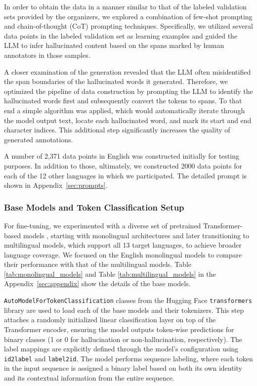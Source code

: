 \documentclass[11pt]{article}
\begin{document}
In order to obtain the data in a manner similar to that of the labeled validation sets provided by the organizers, we explored a combination of few-shot prompting and chain-of-thought (CoT) prompting techniques. Specifically, we utilized several data points in the labeled validation set as learning examples and guided the LLM to infer hallucinated content based on the spans marked by human annotators in those samples. 

A closer examination of the generation revealed that the LLM often misidentified the span boundaries of the hallucinated words it generated. Therefore, we optimized the pipeline of data construction by prompting the LLM to identify the hallucinated words first and subsequently convert the tokens to spans. To that end a simple algorithm was applied, which would automatically iterate through the model output text, locate each hallucinated word, and mark its start and end character indices. This additional step significantly increases the quality of generated annotations. 

A number of 2,371 data points in English was constructed initially for testing purposes. In addition to those, ultimately, we constructed 2000 data points for each of the 12 other languages in which we participated. The detailed prompt is shown in Appendix~\ref{sec:prompts}.


\subsubsection{Base Models and Token Classification Setup}
For fine-tuning, we experimented with a diverse set of pretrained Transformer-based models \cite{vaswani2017attention}, starting with monolingual architectures and later transitioning to multilingual models, which support all 13 target languages, to achieve broader language coverage. We focused on the English monolingual models to compare their performance with that of the multilingual models. Table \ref{tab:monolingual_models} and Table \ref{tab:multilingual_models} in the Appendix~\ref{sec:appendix} show the details of the base models.

\texttt{AutoModelForTokenClassification} classes from the Hugging Face \texttt{transformers} library \cite{wolf-etal-2020-transformers} are used to load each of the base models and their tokenizers. This step attaches a randomly initialized linear classification layer on top of the Transformer encoder, ensuring the model outputs token-wise predictions for binary classes (1 or 0 for hallucination or non-hallucination, respectively). The label mappings are explicitly defined through the model's configuration using \texttt{id2label} and \texttt{label2id}. The model performs sequence labeling, where each token in the input sequence is assigned a binary label based on both its own identity and its contextual information from the entire sequence.
\end{document}
